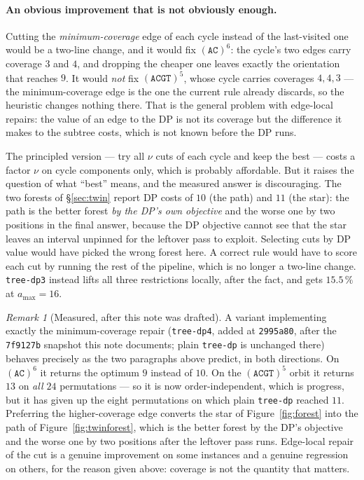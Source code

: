 \documentclass[11pt,a4paper]{article}
\theoremstyle{definition}
\theoremstyle{plain}
\theoremstyle{remark}
\newtheorem{remark}{Remark}
\begin{document}
\paragraph{An obvious improvement that is not obviously enough.}
Cutting the \emph{minimum-coverage} edge of each cycle instead of the
last-visited one would be a two-line change, and it would fix
$(\mathtt{AC})^6$: the cycle's two edges carry coverage $3$ and $4$, and
dropping the cheaper one leaves exactly the orientation that reaches
$9$. It would \emph{not} fix $(\mathtt{ACGT})^5$, whose cycle carries
coverages $4, 4, 3$ --- the minimum-coverage edge is the one the current
rule already discards, so the heuristic changes nothing there. That is
the general problem with edge-local repairs: the value of an edge to the
DP is not its coverage but the difference it makes to the subtree costs,
which is not known before the DP runs.

The principled version --- try all $\nu$ cuts of each cycle and keep the
best --- costs a factor $\nu$ on cycle components only, which is
probably affordable. But it raises the question of what ``best'' means,
and the measured answer is discouraging. The two forests of
\S\ref{sec:twin} report DP costs of $10$ (the path) and $11$ (the star):
the path is the better forest \emph{by the DP's own objective} and the
worse one by two positions in the final answer, because the DP objective
cannot see that the star leaves an interval unpinned for the leftover
pass to exploit. Selecting cuts by DP value would have picked the wrong
forest here. A correct rule would have to score each cut by running the
rest of the pipeline, which is no longer a two-line change.
\texttt{tree-dp3} instead lifts all three restrictions locally, after
the fact, and gets $15.5\,\%$ at $a_{\max} = 16$.

\begin{remark}[Measured, after this note was drafted]
\label{rem:dp4}
A variant implementing exactly the minimum-coverage repair
(\texttt{tree-dp4}, added at \texttt{2995a80}, after the
\texttt{7f9127b} snapshot this note documents; plain \texttt{tree-dp} is
unchanged there) behaves precisely as the two paragraphs above predict,
in both directions. On $(\mathtt{AC})^6$ it returns the optimum $9$
instead of $10$. On the $(\mathtt{ACGT})^5$ orbit it returns $13$ on
\emph{all $24$} permutations --- so it is now order-independent, which
is progress, but it has given up the eight permutations on which plain
\texttt{tree-dp} reached $11$. Preferring the higher-coverage edge
converts the star of Figure~\ref{fig:forest} into the path of
Figure~\ref{fig:twinforest}, which is the better forest by the DP's
objective and the worse one by two positions after the leftover pass
runs. Edge-local repair of the cut is a genuine improvement on some
instances and a genuine regression on others, for the reason given
above: coverage is not the quantity that matters.
\end{remark}
\end{document}
